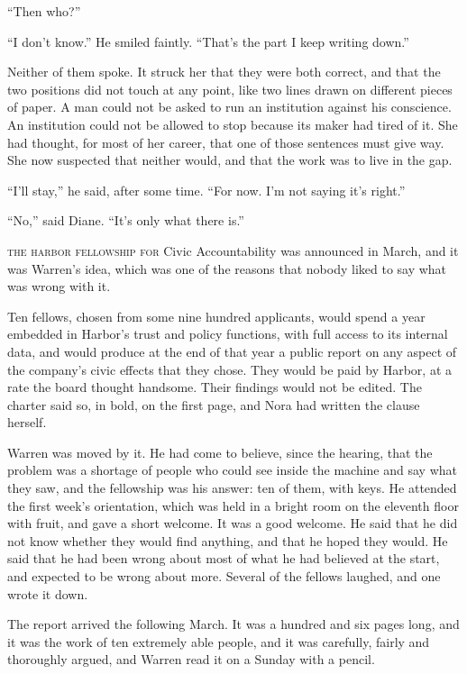 ``Then who?''

``I don't know.'' He smiled faintly. ``That's the part I keep writing down.''

Neither of them spoke. It struck her that they were both correct, and that the two positions did not touch at any point, like two lines drawn on different pieces of paper. A man could not be asked to run an institution against his conscience. An institution could not be allowed to stop because its maker had tired of it. She had thought, for most of her career, that one of those sentences must give way. She now suspected that neither would, and that the work was to live in the gap.

``I'll stay,'' he said, after some time. ``For now. I'm not saying it's right.''

``No,'' said Diane. ``It's only what there is.''


\textsc{the harbor fellowship for} Civic Accountability was announced in March, and it was Warren's idea, which was one of the reasons that nobody liked to say what was wrong with it.

Ten fellows, chosen from some nine hundred applicants, would spend a year embedded in Harbor's trust and policy functions, with full access to its internal data, and would produce at the end of that year a public report on any aspect of the company's civic effects that they chose. They would be paid by Harbor, at a rate the board thought handsome. Their findings would not be edited. The charter said so, in bold, on the first page, and Nora had written the clause herself.

Warren was moved by it. He had come to believe, since the hearing, that the problem was a shortage of people who could see inside the machine and say what they saw, and the fellowship was his answer: ten of them, with keys. He attended the first week's orientation, which was held in a bright room on the eleventh floor with fruit, and gave a short welcome. It was a good welcome. He said that he did not know whether they would find anything, and that he hoped they would. He said that he had been wrong about most of what he had believed at the start, and expected to be wrong about more. Several of the fellows laughed, and one wrote it down.

The report arrived the following March. It was a hundred and six pages long, and it was the work of ten extremely able people, and it was carefully, fairly and thoroughly argued, and Warren read it on a Sunday with a pencil.

